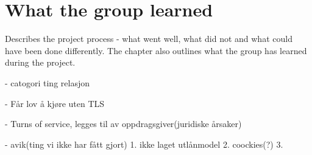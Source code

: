 \section{What the group learned}


 
  



Describes the project process - what went well, what did not and what could have been done differently.
The chapter also outlines what the group has learned during the project.

- catogori ting relasjon

- Får lov å kjøre uten TLS

- Turns of service, legges til av oppdragsgiver(juridiske årsaker) 

- avik(ting vi ikke har fått gjort)
1. ikke laget utlånmodel
2. coockies(?)
3. 